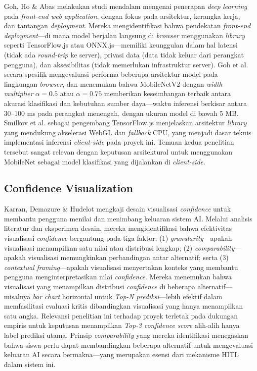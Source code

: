 \documentclass[12pt,a4paper,oneside,openany]{report}
\begin{document}
Goh, Ho \& Abas \cite{ref7} melakukan studi mendalam mengenai penerapan \textit{deep learning} pada \textit{front-end web application}, dengan fokus pada arsitektur, kerangka kerja, dan tantangan \textit{deployment}. Mereka mengidentifikasi bahwa pendekatan \textit{front-end deployment}---di mana model berjalan langsung di \textit{browser} menggunakan \textit{library} seperti TensorFlow.js atau ONNX.js---memiliki keunggulan dalam hal latensi (tidak ada \textit{round-trip} ke server), privasi data (data tidak keluar dari perangkat pengguna), dan aksesibilitas (tidak memerlukan infrastruktur server). Goh et al. secara spesifik mengevaluasi performa beberapa arsitektur model pada lingkungan \textit{browser}, dan menemukan bahwa MobileNetV2 dengan \textit{width multiplier} $\alpha = 0.5$ atau $\alpha = 0.75$ memberikan keseimbangan terbaik antara akurasi klasifikasi dan kebutuhan sumber daya---waktu inferensi berkisar antara 30--100 ms pada perangkat menengah, dengan ukuran model di bawah 5 MB. Smilkov et al. \cite{ref8} sebagai pengembang TensorFlow.js menjelaskan arsitektur \textit{library} yang mendukung akselerasi WebGL dan \textit{fallback} CPU, yang menjadi dasar teknis implementasi inferensi \textit{client-side} pada proyek ini. Temuan kedua penelitian tersebut sangat relevan dengan keputusan arsitektural untuk menggunakan MobileNet sebagai model klasifikasi yang dijalankan di \textit{client-side}.

\subsection{Confidence Visualization}
\label{subsec:penelitian-confidence-vis}

Karran, Demazure \& Hudelot \cite{ref9} mengkaji desain visualisasi \textit{confidence} untuk membantu pengguna menilai dan menimbang keluaran sistem AI. Melalui analisis literatur dan eksperimen desain, mereka mengidentifikasi bahwa efektivitas visualisasi \textit{confidence} bergantung pada tiga faktor: (1) \textit{granularity}---apakah visualisasi menampilkan satu nilai atau distribusi lengkap; (2) \textit{comparability}---apakah visualisasi memungkinkan perbandingan antar alternatif; serta (3) \textit{contextual framing}---apakah visualisasi menyertakan konteks yang membantu pengguna menginterpretasikan nilai \textit{confidence}. Mereka menemukan bahwa visualisasi yang menampilkan distribusi \textit{confidence} di beberapa alternatif---misalnya \textit{bar chart} horizontal untuk \textit{Top-N prediksi}---lebih efektif dalam memfasilitasi evaluasi kritis dibandingkan visualisasi yang hanya menampilkan satu angka. Relevansi penelitian ini terhadap proyek terletak pada dukungan empiris untuk keputusan menampilkan \textit{Top-3 confidence score} alih-alih hanya label prediksi utama. Prinsip \textit{comparability} yang mereka identifikasi menegaskan bahwa siswa perlu dapat membandingkan beberapa alternatif untuk mengevaluasi keluaran AI secara bermakna---yang merupakan esensi dari mekanisme HITL dalam sistem ini.
\end{document}
